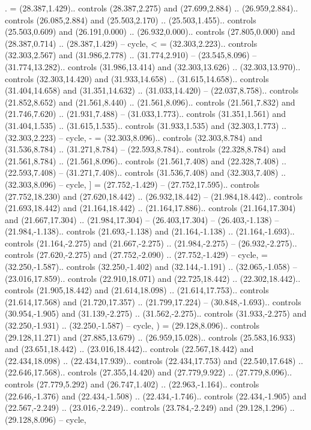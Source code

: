 {.} = {(28.387,1.429).. controls (28.387,2.275) and (27.699,2.884) .. (26.959,2.884).. controls (26.085,2.884) and (25.503,2.170) .. (25.503,1.455).. controls (25.503,0.609) and (26.191,0.000) .. (26.932,0.000).. controls (27.805,0.000) and (28.387,0.714) .. (28.387,1.429) -- cycle},
{<} = {(32.303,2.223).. controls (32.303,2.567) and (31.986,2.778) .. (31.774,2.910) -- (23.545,8.096) -- (31.774,13.282).. controls (31.986,13.414) and (32.303,13.626) .. (32.303,13.970).. controls (32.303,14.420) and (31.933,14.658) .. (31.615,14.658).. controls (31.404,14.658) and (31.351,14.632) .. (31.033,14.420) -- (22.037,8.758).. controls (21.852,8.652) and (21.561,8.440) .. (21.561,8.096).. controls (21.561,7.832) and (21.746,7.620) .. (21.931,7.488) -- (31.033,1.773).. controls (31.351,1.561) and (31.404,1.535) .. (31.615,1.535).. controls (31.933,1.535) and (32.303,1.773) .. (32.303,2.223) -- cycle},
{-} = {(32.303,8.096).. controls (32.303,8.784) and (31.536,8.784) .. (31.271,8.784) -- (22.593,8.784).. controls (22.328,8.784) and (21.561,8.784) .. (21.561,8.096).. controls (21.561,7.408) and (22.328,7.408) .. (22.593,7.408) -- (31.271,7.408).. controls (31.536,7.408) and (32.303,7.408) .. (32.303,8.096) -- cycle},
{]} = {(27.752,-1.429) -- (27.752,17.595).. controls (27.752,18.230) and (27.620,18.442) .. (26.932,18.442) -- (21.984,18.442).. controls (21.693,18.442) and (21.164,18.442) .. (21.164,17.886).. controls (21.164,17.304) and (21.667,17.304) .. (21.984,17.304) -- (26.403,17.304) -- (26.403,-1.138) -- (21.984,-1.138).. controls (21.693,-1.138) and (21.164,-1.138) .. (21.164,-1.693).. controls (21.164,-2.275) and (21.667,-2.275) .. (21.984,-2.275) -- (26.932,-2.275).. controls (27.620,-2.275) and (27.752,-2.090) .. (27.752,-1.429) -- cycle},
{\ctpbackslash} = {(32.250,-1.587).. controls (32.250,-1.402) and (32.144,-1.191) .. (32.065,-1.058) -- (23.016,17.859).. controls (22.910,18.071) and (22.725,18.442) .. (22.302,18.442).. controls (21.905,18.442) and (21.614,18.098) .. (21.614,17.753).. controls (21.614,17.568) and (21.720,17.357) .. (21.799,17.224) -- (30.848,-1.693).. controls (30.954,-1.905) and (31.139,-2.275) .. (31.562,-2.275).. controls (31.933,-2.275) and (32.250,-1.931) .. (32.250,-1.587) -- cycle},
{)} = {(29.128,8.096).. controls (29.128,11.271) and (27.885,13.679) .. (26.959,15.028).. controls (25.583,16.933) and (23.651,18.442) .. (23.016,18.442).. controls (22.567,18.442) and (22.434,18.098) .. (22.434,17.939).. controls (22.434,17.753) and (22.540,17.648) .. (22.646,17.568).. controls (27.355,14.420) and (27.779,9.922) .. (27.779,8.096).. controls (27.779,5.292) and (26.747,1.402) .. (22.963,-1.164).. controls (22.646,-1.376) and (22.434,-1.508) .. (22.434,-1.746).. controls (22.434,-1.905) and (22.567,-2.249) .. (23.016,-2.249).. controls (23.784,-2.249) and (29.128,1.296) .. (29.128,8.096) -- cycle},
